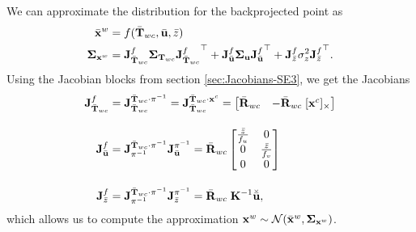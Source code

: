 \begin{example}[frametitle=Uncertainty in backprojection]
We can approximate the distribution for the backprojected point as
\begin{align}
  \bar{\vecx}^w &= f(\bar{\matT}_{wc}, \bar{\vecu}, \bar{z}) \label{eq:est_x}\\
  \matSigma_{\vecx^w} &= \jac{f}{\bar{\matT}_{wc}} \matSigma_{\matT_{wc}} {\jac{f}{\bar{\matT}_{wc}}}\trans +
  \jac{f}{\bar{\vecu}} \matSigma_{\vecu} \jac{f}{\bar{\vecu}}\trans +
  \jac{f}{\bar{z}} \sigma^2_z {\jac{f}{\bar{z}}}\trans. \label{eq:est_S}
\end{align}
Using the Jacobian blocks from section \ref{sec:Jacobians-SE3}, we get the Jacobians
\begin{align}
  \jac{f}{\bar{\matT}_{wc}} &= \jac{\bar{\matT}_{wc} \cdot \pi^{-1}}{\bar{\matT}_{wc}} = \jac{\bar{\matT}_{wc} \cdot \vecx^c}{\bar{\matT}_{wc}} = 
  \begin{bmatrix}
    \bar{\matR}_{wc} & -\bar{\matR}_{wc} \; [\vecx^c]_\times
  \end{bmatrix}\\[1em]
  \jac{f}{\bar{\vecu}} &= \jac{\bar{\matT}_{wc} \cdot \pi^{-1}}{\pi^{-1}} \jac{\pi^{-1}}{\bar{\vecu}} = \bar{\matR}_{wc}
    \begin{bmatrix}
    \frac{\bar{z}}{f_u} & 0\\
    0 & \frac{\bar{z}}{f_v}\\
    0 & 0
  \end{bmatrix}\\[1em]
  \jac{f}{\bar{z}} &= \jac{\bar{\matT}_{wc} \cdot \pi^{-1}}{\pi^{-1}} \jac{\pi^{-1}}{\bar{z}} = \bar{\matR}_{wc} \; \matK^{-1} \breve{\bar{\vecu}},
\end{align}
which allows us to compute the approximation $\vecx^w \sim \cN(\bar{\vecx}^w, \matSigma_{\vecx^w})$.
\end{example}
